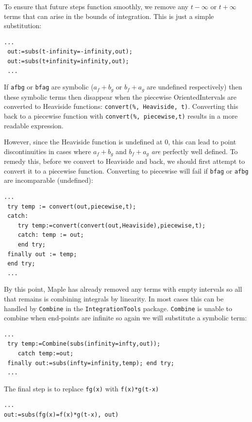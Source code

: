 To ensure that future steps function smoothly, we remove any $t-\infty$ or $t+\infty$ terms that can arise in the 
bounds of integration.
This is just a simple substitution:


\begin{lstlisting}[frame=single]
  ...
 out:=subs(t-infinity=-infinity,out);
 out:=subs(t+infinity=infinity,out);
 ...
\end{lstlisting}

If \texttt{afbg} or \texttt{bfag} are symbolic ($a_f+b_g$ or $b_f+a_g$ are undefined respectively) then
these symbolic terms then disappear when the piecewise OrientedIntervals are converted to Heaviside functions:
 \texttt{convert(\%, Heaviside, t)}.
Converting this back to a piecewise function with \texttt{convert(\%, piecewise,t)} results in a more readable expression.


However, since the Heaviside function is undefined at 0, this can lead to point discontinuities in cases where $a_f+b_g$ and
 $b_f+a_g$ \emph{are} perfectly well defined.
To remedy this, before we convert to Heaviside and back, we should first attempt to convert it to a piecewise function.
Converting to piecewise will fail if \texttt{bfag} or \texttt{afbg} are incomparable (undefined):


\begin{lstlisting}[frame=single]
 ...
 try temp := convert(out,piecewise,t);
 catch: 
    try temp:=convert(convert(out,Heaviside),piecewise,t);
    catch: temp := out;
    end try;  
 finally out := temp; 
 end try;
 ...
\end{lstlisting}


By this point, Maple has already removed any terms with empty intervals so all that remains is combining integrals by 
linearity.
In most cases this can be handled by \texttt{Combine} in the \texttt{IntegrationTools} package.
\texttt{Combine} is unable to combine when end-points are infinite so again we will substitute a symbolic term:


\begin{lstlisting}[frame=single]
 ...
 try temp:=Combine(subs(infinity=infty,out));
    catch temp:=out;
 finally out:=subs(infty=infinity,temp); end try;
 ...
\end{lstlisting}


The final step is to replace \texttt{fg(x)} with \texttt{f(x)*g(t-x)}

\begin{lstlisting}[frame=single]
 ...
out:=subs(fg(x)=f(x)*g(t-x), out)
\end{lstlisting}


